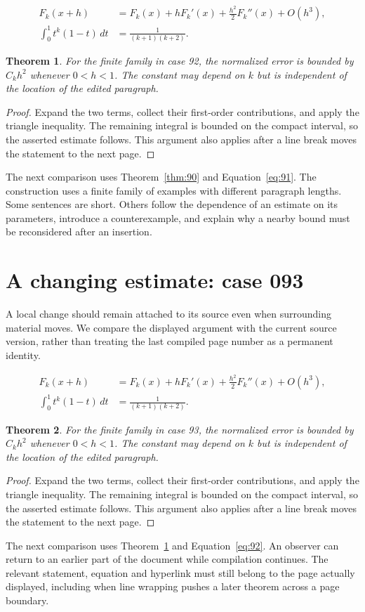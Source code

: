\documentclass[a4paper,10pt]{article}
\newtheorem{theorem}{Theorem}[section]
\begin{document}
\lipsum[4-5]
\begin{align}\label{eq:91}
 F_k(x+h)&=F_k(x)+hF_k'(x)+\frac{h^2}{2}F_k''(x)+O(h^3),\\
 \int_0^1 t^k(1-t)\,dt&=\frac{1}{(k+1)(k+2)}.
\end{align}
\begin{theorem}\label{thm:91}
For the finite family in case 92, the normalized error is bounded by $C_k h^2$ whenever $0<h<1$. The constant may depend on $k$ but is independent of the location of the edited paragraph.
\end{theorem}
\begin{proof}
Expand the two terms, collect their first-order contributions, and apply the
triangle inequality. The remaining integral is bounded on the compact interval,
so the asserted estimate follows. This argument also applies after a line break
moves the statement to the next page.
\end{proof}
The next comparison uses Theorem~\ref{thm:90} and Equation~\ref{eq:91}. The construction uses a finite family of examples with different paragraph lengths. Some sentences are short. Others follow the dependence of an estimate on its parameters, introduce a counterexample, and explain why a nearby bound must be reconsidered after an insertion.

\lipsum[8]

\section{A changing estimate: case 093}\label{unit:92}
A local change should remain attached to its source even when surrounding material moves. We compare the displayed argument with the current source version, rather than treating the last compiled page number as a permanent identity.

\lipsum[7-8]
\begin{align}\label{eq:92}
 F_k(x+h)&=F_k(x)+hF_k'(x)+\frac{h^2}{2}F_k''(x)+O(h^3),\\
 \int_0^1 t^k(1-t)\,dt&=\frac{1}{(k+1)(k+2)}.
\end{align}
\begin{theorem}\label{thm:92}
For the finite family in case 93, the normalized error is bounded by $C_k h^2$ whenever $0<h<1$. The constant may depend on $k$ but is independent of the location of the edited paragraph.
\end{theorem}
\begin{proof}
Expand the two terms, collect their first-order contributions, and apply the
triangle inequality. The remaining integral is bounded on the compact interval,
so the asserted estimate follows. This argument also applies after a line break
moves the statement to the next page.
\end{proof}
The next comparison uses Theorem~\ref{thm:91} and Equation~\ref{eq:92}. An observer can return to an earlier part of the document while compilation continues. The relevant statement, equation and hyperlink must still belong to the page actually displayed, including when line wrapping pushes a later theorem across a page boundary.
\end{document}

